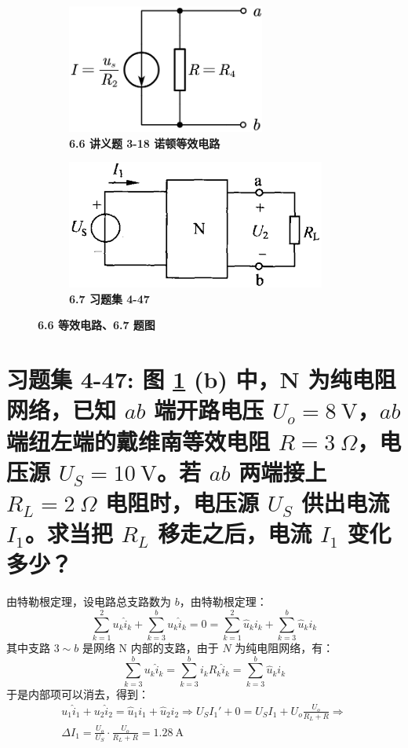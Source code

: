 \documentclass[UTF8]{report}
\theoremstyle{MyLineTheoremStyle} %
\theoremstyle{MyBlockTheoremStyle} %
\theoremstyle{MySubsubsectionStyle} %
\begin{document}
\begin{figure}[H]\centering
\begin{subfigure}[t]{0.5\columnwidth}\centering
    \includegraphics[height=120pt]{assets/6/9d53a9b244bf76e6ad1734869043135a.png}
    \caption{\bfseries 6.6 讲义题 3-18 诺顿等效电路 }
\end{subfigure}\hfill
\begin{subfigure}[t]{0.5\columnwidth}\centering
    \includegraphics[height=120pt]{assets/6/2e96a177467ade2ca35ed590fb9751d7.png}
    \caption{\bfseries 6.7 习题集 4-47 }
\end{subfigure}
\caption{\bfseries 6.6 等效电路、6.7 题图 }\label{6.6 等效电路、6.7 题图}
\end{figure}

\section{习题集 4-47: 图 \ref{6.6 等效电路、6.7 题图} (b) 中，N 为纯电阻网络，已知 $ab$ 端开路电压 $U_o = 8 \ \mathrm{V}$，$ab$ 端纽左端的戴维南等效电阻 $R = 3 \ \Omega$，电压源 $U_S = 10 \ \mathrm{V}$。若 $ab$ 两端接上 $R_L = 2 \ \Omega$ 电阻时，电压源 $U_S$ 供出电流 $I_1$。求当把 $R_L$ 移走之后，电流 $I_1$ 变化多少？} 

由特勒根定理，设电路总支路数为 $b$，由特勒根定理：
\begin{equation}
\sum_{k = 1}^{2} u_k \hat{i}_k + \sum_{k = 3}^{b} u_k \hat{i}_k =  0 = \sum_{k = 1}^{2} \hat{u}_k i_k + \sum_{k = 3}^{b} \hat{u}_k i_k 
\end{equation}
其中支路 $3 \sim b$ 是网络 N 内部的支路，由于 $N$ 为纯电阻网络，有：
\begin{equation}
    \sum_{k = 3}^{b} u_k \hat{i}_k  = \sum_{k = 3}^{b} i_k R_k \hat{i}_k =  \sum_{k = 3}^{b} \hat{u}_k i_k 
\end{equation}
于是内部项可以消去，得到：
\begin{gather}
    u_1\hat{i}_1 + u_2 \hat{i}_2 = \hat{u}_1i_1 + \hat{u}_2 i_2 \Longrightarrow 
U_S I_1' + 0 = U_SI_1 + U_o \frac{U_o}{R_L + R}
\Longrightarrow \\
\boxed{
    \Delta I_1 = \frac{U_o}{U_S}\cdot\frac{U_o}{R_L + R} = 1.28 \ \mathrm{A}
}
\end{gather}
\end{document}
